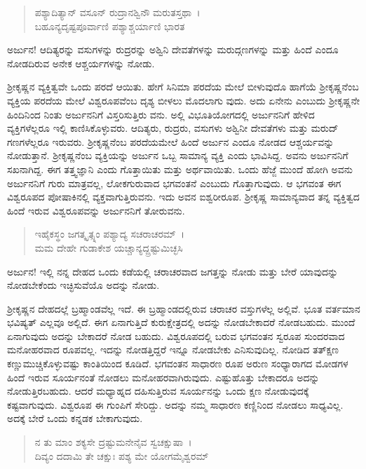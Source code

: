 \begin{verse}
ಪಶ್ಯಾದಿತ್ಯಾನ್ ವಸೂನ್ ರುದ್ರಾನಶ್ವಿನೌ ಮರುತಸ್ತಥಾ~।\\ಬಹೂನ್ಯದೃಷ್ಟಪೂರ್ವಾಣಿ ಪಶ್ಯಾಶ್ಚರ್ಯಾಣಿ ಭಾರತ 
\end{verse}

{\small ಅರ್ಜುನ! ಆದಿತ್ಯರನ್ನು ವಸುಗಳನ್ನು ರುದ್ರರನ್ನು ಅಶ್ವಿನಿ ದೇವತೆಗಳನ್ನು ಮರುದ್ಗಣಗಳನ್ನು ಮತ್ತು ಹಿಂದೆ ಎಂದೂ ನೋಡದಿರುವ ಅನೇಕ ಆಶ್ಚರ್ಯಗಳನ್ನು ನೋಡು.}

ಶ‍್ರೀಕೃಷ್ಣನ ವ್ಯಕ್ತಿತ್ವವೇ ಒಂದು ಪರದೆ ಆಯಿತು. ಹೇಗೆ ಸಿನಿಮಾ ಪರದೆಯ ಮೇಲೆ ಬೀಳುವುದೊ ಹಾಗೆಯೆ ಶ‍್ರೀಕೃಷ್ಣನೆಂಬ ವ್ಯಕ್ತಿಯ ಪರದೆಯ ಮೇಲೆ ವಿಶ್ವರೂಪವೆಂಬ ದೃಶ್ಯ ಬೀಳಲು ಮೊದಲಾಗು ವುದು. ಅದು ಏನೇನು ಎಂಬುದು ಶ‍್ರೀಕೃಷ್ಣನೇ ಹಿಂದಿನಿಂದ ನಿಂತು ಅರ್ಜುನನಿಗೆ ವಿಸ್ತರಿಸುತ್ತಿರು ವನು. ಅಲ್ಲಿ ವಿಭೂತಿಯೋಗದಲ್ಲಿ ಅರ್ಜುನನಿಗೆ ಹೇಳಿದ ವ್ಯಕ್ತಿಗಳೆಲ್ಲರೂ ಇಲ್ಲಿ ಕಾಣಿಸಿಕೊಳ್ಳುವರು. ಆದಿತ್ಯರು, ರುದ್ರರು, ವಸುಗಳು ಅಶ್ವಿನೀ ದೇವತೆಗಳು ಮತ್ತು ಮರುದ್​ಗಣಗಳೆಲ್ಲರೂ ಇರುವರು. ಶ‍್ರೀಕೃಷ್ಣನೆಂಬ ಪರದೆಯಮೇಲೆ ಹಿಂದೆ ಅರ್ಜುನ ಎಂದೂ ನೋಡದ ಆಶ್ಚರ್ಯವನ್ನು ನೋಡುತ್ತಾನೆ. ಶ‍್ರೀಕೃಷ್ಣನೆಂಬ ವ್ಯಕ್ತಿಯನ್ನು ಅರ್ಜುನ ಒಬ್ಬ ಸಾಮಾನ್ಯ ವ್ಯಕ್ತಿ ಎಂದು ಭಾವಿಸಿದ್ದ. ಅವನು ಅರ್ಜುನನಿಗೆ ಸಖನಾಗಿದ್ದ. ಈಗ ತತ್ತ್ವಜ್ಞಾನಿ ಎಂದು ಗೊತ್ತಾಯಿತು ಮತ್ತು ಅರ್ಥವಾಯಿತು. ಒಂದು ಹೆಜ್ಜೆ ಮುಂದೆ ಹೋಗಿ ಅವನು ಅರ್ಜುನನಿಗೆ ಗುರು ಮಾತ್ರವಲ್ಲ, ಲೋಕಗುರುವಾದ ಭಗವಂತನೆ ಎಂಬುದು ಗೊತ್ತಾಗುವುದು. ಆ ಭಗವಂತ ಈಗ ವಿಶ್ವರೂಪದ ಪೋಷಾಕಿನಲ್ಲಿ ವ್ಯಕ್ತವಾಗುತ್ತಿರುವನು. ಇದು ಅವನ ಐಶ್ವರೀರೂಪ. ಶ‍್ರೀಕೃಷ್ಣ ಸಾಮಾನ್ಯವಾದ ತನ್ನ ವ್ಯಕ್ತಿತ್ವದ ಹಿಂದೆ ಇರುವ ವಿಶ್ವರೂಪವನ್ನು ಅರ್ಜುನನಿಗೆ ತೋರುವನು.

\begin{verse}
ಇಹೈಕಸ್ಥಂ ಜಗತ್ಕೃತ್ಸ್ನಂ ಪಶ್ಯಾದ್ಯ ಸಚರಾಚರಮ್~।\\ಮಮ ದೇಹೇ ಗುಡಾಕೇಶ ಯಚ್ಚಾನ್ಯದ್ದ್ರಷ್ಟುಮಿಚ್ಛಸಿ 
\end{verse}

{\small ಅರ್ಜುನ! ಇಲ್ಲಿ ನನ್ನ ದೇಹದ ಒಂದು ಕಡೆಯಲ್ಲಿ ಚರಾಚರವಾದ ಜಗತ್ತನ್ನು ನೋಡು ಮತ್ತು ಬೇರೆ ಯಾವುದನ್ನು ನೋಡಬೇಕೆಂದು ಇಚ್ಛಿಸುವೆಯೊ ಅದನ್ನು ನೋಡು.}

ಶ‍್ರೀಕೃಷ್ಣನ ದೇಹದಲ್ಲೆ ಬ್ರಹ್ಮಾಂಡವೆಲ್ಲ ಇದೆ. ಈ ಬ್ರಹ್ಮಾಂಡದಲ್ಲಿರುವ ಚರಾಚರ ವಸ್ತುಗಳೆಲ್ಲ ಅಲ್ಲಿವೆ. ಭೂತ ವರ್ತಮಾನ ಭವಿಷ್ಯತ್ ಎಲ್ಲವೂ ಅಲ್ಲಿದೆ. ಈಗ ಏನಾಗುತ್ತಿದೆ ಕುರುಕ್ಷೇತ್ರದಲ್ಲಿ ಅದನ್ನು ನೋಡಬೇಕಾದರೆ ನೋಡಬಹುದು. ಮುಂದೆ ಏನಾಗುವುದು ಅದನ್ನು ಬೇಕಾದರೆ ನೋಡ ಬಹುದು. ವಿಶ್ವರೂಪದಲ್ಲಿ ಬರುವ ಭಗವಂತನ ಸ್ವರೂಪ ಸುಂದರವಾದ ಮನೋಹರವಾದ ರೂಪವಲ್ಲ. ಇದನ್ನು ನೋಡತ್ತಿದ್ದರೆ ಇನ್ನೂ ನೋಡಬೇಕು ಎನಿಸುವುದಿಲ್ಲ. ನೋಡಿದ ತತ್​ಕ್ಷಣ ಕಣ್ಣುಮುಚ್ಚಿಕೊಳ್ಳುವಷ್ಟು ಕಾಂತಿಯಿಂದ ಕೂಡಿದೆ. ಭಗವಂತನ ಸಾಧಾರಣ ರೂಪ ಅರುಣ ಸಂಧ್ಯಾರಾಗದ ಮೋಡಗಳ ಹಿಂದೆ ಇರುವ ಸೂರ್ಯನಂತೆ ನೋಡಲು ಮನೋಹರವಾಗಿರುವುದು. ಎಷ್ಟುಹೊತ್ತು ಬೇಕಾದರೂ ಅದನ್ನು ನೋಡುತ್ತಿರಬಹುದು. ಆದರೆ ಮಧ್ಯಾಹ್ನದ ದಹಿಸುತ್ತಿರುವ ಸೂರ್ಯನನ್ನು ಒಂದು ಕ್ಷಣ ನೋಡುವುದಕ್ಕೆ ಕಷ್ಟವಾಗುವುದು. ವಿಶ್ವರೂಪ ಈ ಗುಂಪಿಗೆ ಸೇರಿದ್ದು. ಅದನ್ನು ನಮ್ಮ ಸಾಧಾರಣ ಕಣ್ಣಿನಿಂದ ನೋಡಲು ಸಾಧ್ಯವಿಲ್ಲ. ಅದಕ್ಕೆ ಬೇರೆ ಒಂದು ಕನ್ನಡಕ ಬೇಕಾಗುವುದು.

\begin{verse}
ನ ತು ಮಾಂ ಶಕ್ಯಸೇ ದ್ರಷ್ಟುಮನೇನೈವ ಸ್ವಚಕ್ಷುಷಾ~।\\ದಿವ್ಯಂ ದದಾಮಿ ತೇ ಚಕ್ಷುಃ ಪಶ್ಯ ಮೇ ಯೋಗಮೈಶ್ವರಮ್ 
\end{verse}

